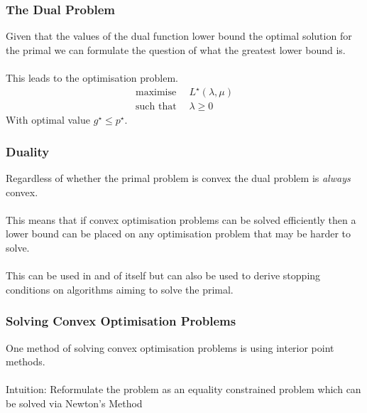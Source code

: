 \documentclass{beamer}
\begin{document}
\begin{frame}
    \frametitle{The Dual Problem}
    Given that the values of the dual function lower bound the optimal solution
    for the primal we can formulate the question of what the greatest lower
    bound is.
    \\~\\
    This leads to the optimisation problem.
    {\footnotesize
    \begin{align*}
        \text{maximise } \, &L^{\star}(\lambda, \mu)\\
        \text{such that } &\lambda \geq 0
    \end{align*}}
    With optimal value $g^{\star} \leq p^{\star}$. \end{frame}

\begin{frame}
    \frametitle{Duality}
    Regardless of whether the primal problem is convex the dual problem is
    \textit{always} convex.
    \\~\\
    This means that if convex optimisation problems can be solved efficiently
    then a lower bound can be placed on any optimisation problem that may be
    harder to solve.
    \\~\\
    This can be used in and of itself but can also be used to derive stopping
    conditions on algorithms aiming to solve the primal.
\end{frame}

\begin{frame}
    \frametitle{Solving Convex Optimisation Problems}
    One method of solving convex optimisation problems is using interior point
    methods.
    \\~\\
    Intuition: Reformulate the problem as an equality constrained problem which
    can be solved via Newton's Method
\end{frame}
\end{document}
